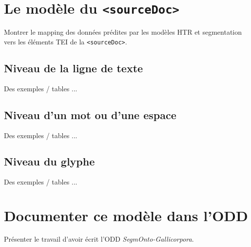 \documentclass[class=article, crop=false]{standalone}
\begin{document}
\section{Le modèle du \texttt{<sourceDoc>}}

Montrer le mapping des données prédites par les modèles HTR et segmentation vers les éléments TEI de la \texttt{<sourceDoc>}.

\subsection{Niveau de la ligne de texte}

Des exemples / tables ...

\subsection{Niveau d'un mot ou d'une espace}

Des exemples / tables ...

\subsection{Niveau du glyphe}

Des exemples / tables ...

\section{Documenter ce modèle dans l'ODD}

Présenter le travail d'avoir écrit l'ODD \textit{SegmOnto-Gallicorpora}.
\end{document}
